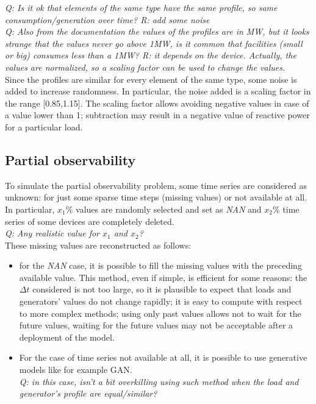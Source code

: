 \emph{Q: Is it ok that elements of the same type have the same profile, so same consumption/generation over time? R: add some noise} \\
\emph{Q: Also from the documentation the values of the profiles are in MW, but it looks strange that the values never go above 1MW, is it common that facilities (small or big) consumes less than a 1MW? R: it depends on the device. Actually, the values are normalized, so a scaling factor can be used to change the values.} \\

Since the profiles are similar for every element of the same type, some noise is added to increase randomness. In particular, the noise added is a scaling factor in the range [0.85,1.15]. The scaling factor allows avoiding negative values in case of a value lower than 1; subtraction may result in a negative value of reactive power for a particular load. \\

\subsection{Partial observability}
To simulate the partial observability problem, some time series are considered as unknown: for just some sparse time steps (missing values) or not available at all. \\

In particular, $x_1\%$ values are randomly selected and set as \emph{NAN} and $x_2\%$ time series of some devices are completely deleted.\\
\emph{Q: Any realistic value for $x_1$ and $x_2$? \label{q:partialobvals}} \\

\noindent These missing values are reconstructed as follows:
\begin{itemize}
    \item for the \emph{NAN} case, it is possible to fill the missing values with the preceding available value. This method, even if simple, is efficient for some reasons: the $\Delta t$ considered is not too large, so it is plausible to expect that loads and generators' values do not change rapidly; it is easy to compute with respect to more complex methods; using only past values allows not to wait for the future values, waiting for the future values may not be acceptable after a deployment of the model.
    
    \item For the case of time series not available at all, it is possible to use generative models like for example \gls{GAN}.\\
    \emph{Q: in this case, isn't a bit overkilling using such method when the load and generator's profile are equal/similar? \label{q:gan}}
\end{itemize}

